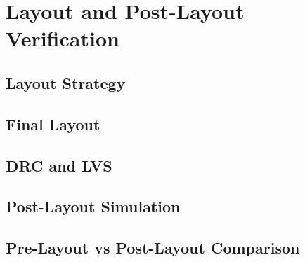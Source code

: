 
\section{Layout and Post-Layout Verification}
\label{sec:layout_postlayout}

\subsection{Layout Strategy}



\subsection{Final Layout}



\subsection{DRC and LVS}



\subsection{Post-Layout Simulation}



\subsection{Pre-Layout vs Post-Layout Comparison}

